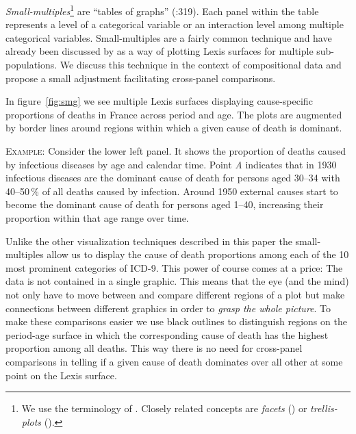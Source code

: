 \documentclass[parskip=half]{scrartcl}
\begin{document}
\emph{Small-multiples}\footnote{
  We use the terminology of \textcite{Tufte1990}. Closely related concepts are \emph{facets} (\cite{Wilkinson2005}) or \emph{trellis-plots} (\cite{Becker1996}).
}
are \enquote{tables of graphs} (\cite{Wilkinson2005}:319). Each panel within the table represents a level of a categorical variable or an interaction level among multiple categorical variables. Small-multiples are a fairly common technique and have already been discussed by \textcite{Vaupel1987a} as a way of plotting Lexis surfaces for multiple sub-populations. We discuss this technique in the context of compositional data and propose a small adjustment facilitating cross-panel comparisons.

In figure~\ref{fig:smg} we see multiple Lexis surfaces displaying cause-specific proportions of deaths in France across period and age. The plots are augmented by border lines around regions within which a given cause of death is dominant.

\textsc{Example:} Consider the lower left panel. It shows the proportion of deaths caused by infectious diseases by age and calendar time. Point \emph{A} indicates that in 1930 infectious diseases are the dominant cause of death for persons aged 30--34 with 40--50\,\% of all deaths caused by infection. Around 1950 external causes start to become the dominant cause of death for persons aged 1--40, increasing their proportion within that age range over time.

Unlike the other visualization techniques described in this paper the small-multiples allow us to display the cause of death proportions among each of the 10 most prominent categories of ICD-9. This power of course comes at a price: The data is not contained in a single graphic. This means that the eye (and the mind) not only have to move between and compare different regions of a plot but make connections between different graphics in order to \emph{grasp the whole picture}. To make these comparisons easier we use black outlines to distinguish regions on the period-age surface in which the corresponding cause of death has the highest proportion among all deaths. This way there is no need for cross-panel comparisons in telling if a given cause of death dominates over all other at some point on the Lexis surface.
\end{document}
